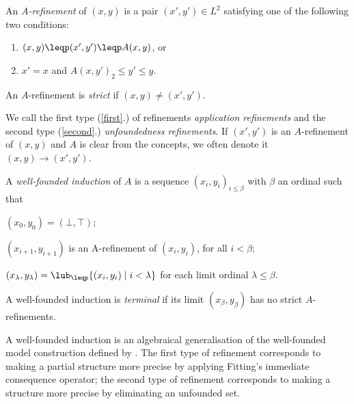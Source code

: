 \begin{definition}\label{002:def:refinement}
An \emph{$A$-refinement} of $(x,y)$ is a pair $(x',y')\in L^2$ satisfying one of the following two conditions:
\begin{enumerate}
	\item $(x,y)\leqp(x',y')\leqp A(x,y)$, or \label{first}
	\item $x'=x$ and  $A(x,y')_2\leq y'\leq y$. \label{second}
\end{enumerate}
An $A$-refinement is \emph{strict} if $(x,y)\neq (x',y')$.
\end{definition}

We call the first type (\ref{first}.) of refinements \emph{application refinements} and the second type (\ref{second}.) \emph{unfoundedness refinements}. If $(x',y')$ is an $A$-refinement of $(x,y)$ and $A$ is clear from the concepts, we often denote it $(x,y)\to(x',y')$.
%

 \begin{definition}
 A \emph{well-founded induction} of $A$  is a sequence 
$(x_i,y_i)_{i\leq \beta}$
with $\beta$ an ordinal such that 
\begin{compactitem}
	\item $(x_0,y_0) = (\bot,\top)$;
	\item $(x_{i+1},y_{i+1})$ is an A-refinement of $(x_{i},y_{i})$, for  all $i<\beta$;
	\item $(x_{\lambda},y_{\lambda})= \lub_{\leqp} \{(x_i,y_i)\mid i<\lambda\}$
	      for each limit ordinal $\lambda\leq\beta$.
\end{compactitem}
A well-founded induction is \emph{terminal} if its limit $(x_\beta,y_\beta)$ has no strict $A$-refinements.
\end{definition}
A well-founded induction is an algebraical generalisation of the well-founded model construction defined by \cite{GelderRS91}. 
The first type of refinement corresponds to making a partial structure more precise by applying Fitting's immediate consequence operator; the second type of refinement corresponds to making a structure more precise by eliminating an unfounded set. 

